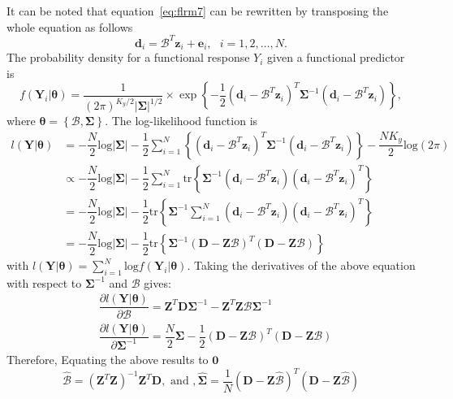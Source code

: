 It can be noted that equation~\eqref{eq:flrm7} can be rewritten by transposing the whole equation as follows
\begin{equation}
\bm{d}_{i} = \bm{\mathcal{B}}^T\bm{z}_i  + \bm{e}_i,\text{ }i = 1,2,\dots,N.
\end{equation}
The probability density for a functional response $Y_i$ given a functional predictor is
\begin{equation}\label{flrm8}
f(\bm{Y}_i|\bm{\theta}) = \dfrac{1}{(2 \pi)^{K_y/2} |\bm{\Sigma}|^{1/2}} \times \exp \left\{-\dfrac{1}{2}\left(\bm{d}_{i} - \bm{\mathcal{B}}^T\bm{z}_i\right)^T \bm{\Sigma}^{-1} \left(\bm{d}_{i} - \bm{\mathcal{B}}^T\bm{z}_i\right) \right\},
\end{equation}
where $\bm{\theta} = \left\{\bm{\mathcal{B}},\bm{\Sigma} \right\}$. The log-likelihood function is
\begin{align}
l(\bm{Y}|\bm{\theta}) &= -\dfrac{N}{2} \text{log}|\bm{\Sigma}| - \dfrac{1}{2} \sum_{i=1}^{N} \left\{\left(\bm{d}_{i} - \bm{\mathcal{B}}^T\bm{z}_i\right)^T \bm{\Sigma}^{-1} \left(\bm{d}_{i} - \bm{\mathcal{B}}^T\bm{z}_i\right) \right\} -\dfrac{N K_y}{2} \text{log}(2 \pi) \nonumber \\
& \propto -\dfrac{N}{2} \text{log}|\bm{\Sigma}| - \dfrac{1}{2} \sum_{i=1}^{N} \text{tr} \left\{\bm{\Sigma}^{-1}\left(\bm{d}_{i} - \bm{\mathcal{B}}^T\bm{z}_i\right) \left(\bm{d}_{i} - \bm{\mathcal{B}}^T\bm{z}_i\right)^T \right\} \nonumber \\
&= -\dfrac{N}{2} \text{log}|\bm{\Sigma}| - \dfrac{1}{2} \text{tr}  \left\{\bm{\Sigma}^{-1} \sum_{i=1}^{N} \left(\bm{d}_{i} - \bm{\mathcal{B}}^T\bm{z}_i\right) \left(\bm{d}_{i} - \bm{\mathcal{B}}^T\bm{z}_i\right)^T \right\} \nonumber \\
&= -\dfrac{N}{2} \text{log}|\bm{\Sigma}| - \dfrac{1}{2} \text{tr}  \left\{\bm{\Sigma}^{-1} \left(\bm{D} - \bm{Z} \bm{\mathcal{B}}\right)^T \left(\bm{D} - \bm{Z} \bm{\mathcal{B}}\right) \right\} \label{flrm9}
\end{align}
with $l(\bm{Y}|\bm{\theta}) = \sum_{i=1}^{N} \text{log} f(\bm{Y}_i|\bm{\theta})$. Taking the derivatives of the above equation with respect to $\bm{\Sigma}^{-1}$ and $\bm{\mathcal{B}}$ gives:
\begin{align}\label{optimflrm}
& \dfrac{\partial l(\bm{Y}|\bm{\theta})}{\partial \bm{\mathcal{B}}} = \bm{Z}^T\bm{D}\bm{\Sigma}^{-1} - \bm{Z}^T\bm{Z}\bm{\mathcal{B}}\bm{\Sigma}^{-1} \nonumber \\
& \dfrac{\partial l(\bm{Y}|\bm{\theta})}{\partial \bm{\Sigma}^{-1}} = \dfrac{N}{2}\bm{\Sigma}-\dfrac{1}{2}\left(\bm{D} - \bm{Z} \bm{\mathcal{B}}\right)^T \left(\bm{D} - \bm{Z} \bm{\mathcal{B}}\right) \nonumber
\end{align}
Therefore, Equating the above results to $\bm{0}$
\begin{equation}
\hat{\bm{\mathcal{B}}} = \left(\bm{Z}^T \bm{Z}\right)^{-1} \bm{Z}^T \bm{D},\text{   and   },\hat{\bm{\Sigma}} = \dfrac{1}{N} \left(\bm{D} - \bm{Z} \hat{\bm{\mathcal{B}}}\right)^T \left(\bm{D} - \bm{Z} \hat{\bm{\mathcal{B}}}\right)
\end{equation}

